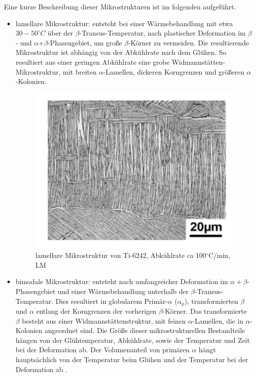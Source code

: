 Eine kurze Beschreibung dieser Mikrostrukturen ist im folgenden aufgeführt.

\begin{itemize} 
	\item lamellare Mikrostruktur: entsteht bei einer Wärmebehandlung mit etwa $30-50 ^\circ C$ über der $\beta$-Transus-Temperatur, nach plastischer Deformation im $\beta$- und $\alpha$+$\beta$-Phasengebiet, um große $\beta$-Körner zu vermeiden. Die resultierende Mikrostruktur ist abhängig von der Abkühlrate nach dem Glühen. So resultiert aus einer geringen Abkühlrate eine grobe Widmannstätten-Mikrostruktur, mit breiten $\alpha$-Lamellen, dickeren Korngrenzen und größeren $\alpha$-Kolonien. 

\begin{figure}[h]
	\centering
	\includegraphics[width=0.7\linewidth]{./Bilder/Abbildung 3}
	\caption[Abbildung 3]{lamellare Mikrostruktur von Ti-6242, Abkühlrate ca 100$^\circ$C/min, LM \cite{Lutjering.2007}}
	\label{fig:abbildung-3}
\end{figure}

\pagebreak

\item bimodale Mikrostruktur: entsteht nach umfangreicher Deformation im $\alpha+\beta$-Phasengebiet und einer Wärmebehandlung unterhalb der $\beta$-Transus-Temperatur. Dies resultiert in globularem Primär-$\alpha$ ($\alpha_p$), transformierten $\beta$ und $\alpha$ entlang der Korngrenzen der vorherigen $\beta$-Körner. Das transformierte $\beta$ besteht aus einer Widmannstättenstruktur, mit feinen $\alpha$-Lamellen, die in $\alpha$-Kolonien angeordnet sind. Die Größe dieser mikrostrukturellen Bestandteile hängen von der Glühtemperatur, Abkühlrate, sowie der Temperatur und Zeit bei der Deformation ab. Der Volumenanteil von primären $\alpha$ hängt hauptsächlich von der Temperatur beim Glühen und der Temperatur bei der Deformation ab \cite{Lutjering.2007}.


\end{itemize}
